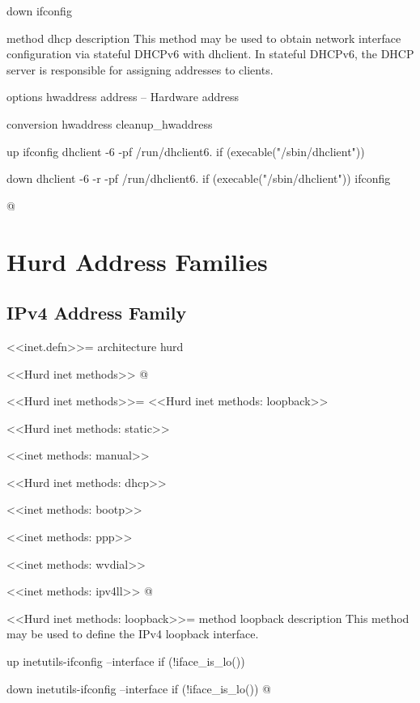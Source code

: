 \documentclass{article}
\begin{document}
  down
    ifconfig %



method dhcp
  description
    This method may be used to obtain network interface configuration via
    stateful DHCPv6 with dhclient.  In stateful DHCPv6, the DHCP server is
    responsible for assigning addresses to clients.

  options
    hwaddress address      -- Hardware address

  conversion
    hwaddress cleanup_hwaddress

  up
    ifconfig %
    dhclient -6 -pf /run/dhclient6.%
        if (execable("/sbin/dhclient"))

  down
    dhclient -6 -r -pf /run/dhclient6.%
        if (execable("/sbin/dhclient"))
    ifconfig %

@ 

\section{Hurd Address Families}
\subsection{IPv4 Address Family}

<<inet.defn>>=
architecture hurd

<<Hurd inet methods>>
@ 

<<Hurd inet methods>>=
<<Hurd inet methods: loopback>>

<<Hurd inet methods: static>>

<<inet methods: manual>>

<<Hurd inet methods: dhcp>>

<<inet methods: bootp>>

<<inet methods: ppp>>

<<inet methods: wvdial>>

<<inet methods: ipv4ll>>
@ 

<<Hurd inet methods: loopback>>=
method loopback
  description
    This method may be used to define the IPv4 loopback interface.

  up
    inetutils-ifconfig --interface %
	if (!iface_is_lo())

  down
    inetutils-ifconfig --interface %
	if (!iface_is_lo())
@ 
\end{document}

